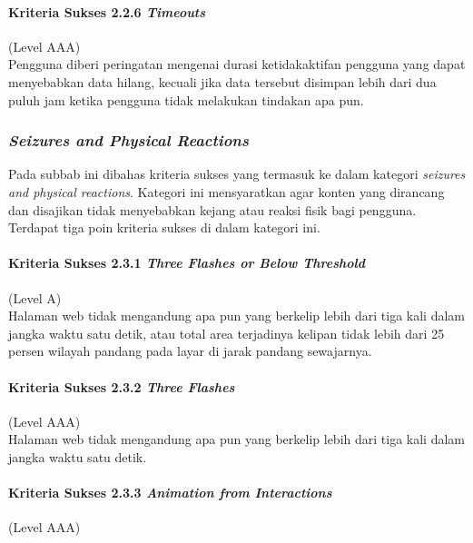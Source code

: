\paragraph{Kriteria Sukses 2.2.6 \textit{Timeouts}}
\label{sec:kriteria_sukses_2.2.6}
(Level AAA)\\

Pengguna diberi peringatan mengenai durasi ketidakaktifan pengguna yang dapat menyebabkan data hilang, kecuali jika data tersebut disimpan lebih dari dua puluh jam ketika pengguna tidak melakukan tindakan apa pun.

\subsubsection{\textit{Seizures and Physical Reactions}}
\label{sec:seizures_and_physical_reactions}
Pada subbab ini dibahas kriteria sukses yang termasuk ke dalam kategori \textit{seizures and physical reactions}. Kategori ini mensyaratkan agar konten yang dirancang dan disajikan tidak menyebabkan kejang atau reaksi fisik bagi pengguna. Terdapat tiga poin kriteria sukses di dalam kategori ini.

\paragraph{Kriteria Sukses 2.3.1 \textit{Three Flashes or Below Threshold}}
\label{sec:kriteria_sukses_2.3.1}
(Level A)\\

Halaman web tidak mengandung apa pun yang berkelip lebih dari tiga kali dalam jangka waktu satu detik, atau total area terjadinya kelipan tidak lebih dari 25 persen wilayah pandang pada layar di jarak pandang sewajarnya. 

\paragraph{Kriteria Sukses 2.3.2 \textit{Three Flashes}}
\label{sec:kriteria_sukses_2.3.2}
(Level AAA)\\

Halaman web tidak mengandung apa pun yang berkelip lebih dari tiga kali dalam jangka waktu satu detik.

\paragraph{Kriteria Sukses 2.3.3 \textit{Animation from Interactions}}
\label{sec:kriteria_sukses_2.3.3}
(Level AAA)\\

